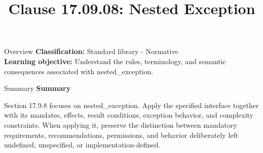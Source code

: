 \documentclass[10pt,letterpaper]{article}
\title{Clause 17.09.08: Nested Exception}
\author{}
\date{}
\begin{document}
\maketitle
\begin{CornellOverviewBox}{Overview}
\textbf{Classification:} Standard library - Normative\\[2pt]
\textbf{Learning objective:} Understand the rules, terminology, and semantic consequences associated with nested\_exception.
\end{CornellOverviewBox}\begin{CornellSummaryBox}{Summary}
{\sffamily\bfseries\color{Accent} Summary}\par\vspace{3pt}Section 17.9.8 focuses on nested\_exception. Apply the specified interface together with its mandates, effects, result conditions, exception behavior, and complexity constraints. When applying it, preserve the distinction between mandatory requirements, recommendations, permissions, and behavior deliberately left undefined, unspecified, or implementation-defined.
\end{CornellSummaryBox}
\end{document}
